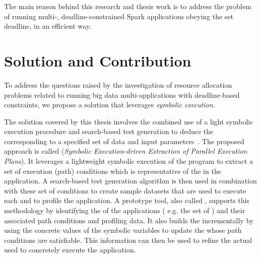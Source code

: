 The main reason behind this research and thesis work is to address the problem of running multi-\plan, deadline-constrained Spark applications obeying the set deadline, in an efficient way.

\section{Solution and Contribution}\label{sec:solution_contribution}
To address the questions raised by the investigation of resource allocation problems related to running big data multi-\plan applications with deadline-based \qos constraints, we propose a solution that leverages \textit{symbolic execution}. 





The solution covered by this thesis involves the combined use of a light symbolic execution procedure and search-based test generation to deduce the \plan corresponding to a specified set of data and input parameters~\cite{Baresi-Quattrocchi-Denaro:2019}. The proposed approach is called \dSymb (\textit{Symbolic Execution-driven Extraction of Parallel Execution Plans}).  It leverages a lightweight symbolic execution of the program to extract a set of execution (path) conditions which is representative of the \plans in the application. A search-based test generation algorithm is then used in combination with these set of conditions to create sample datasets that are used to execute each \plan and to profile the application. A prototype tool, also called \dSymb, supports this methodology by identifying the \model of the applications ( e.g. the set of \plans) and their associated path conditions and profiling data. It also builds the \model incrementally by using the concrete values of the symbolic variables to update the \plans whose path conditions are satisfiable. This information can then be used to refine the actual \plan used to concretely execute the application. 

